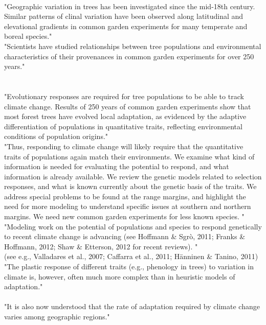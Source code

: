 \documentclass{article}
\begin{document}
\citep{AitkenBemmels16}\\
"Geographic variation in trees has been investigated since the mid-18th century. Similar patterns of clinal variation have been observed along latitudinal and elevational gradients in common garden experiments for many temperate and boreal species."\\
"Scientists have studied relationships between tree populations and environmental characteristics of their provenances in common garden experiments for over 250 years."\\
\\
\citep{Alberto13}\\
"Evolutionary responses are required for tree populations to be able to track climate change. Results of 250 years of common garden experiments show that most forest trees have evolved local adaptation, as evidenced by the adaptive differentiation of populations in quantitative traits, reflecting environmental conditions of population origins."\\
"Thus, responding to climate change will likely require that the quantitative traits of populations again match their environments. We examine what kind of information is needed for evaluating the potential to respond, and what information is already available. We review the genetic models related to selection responses, and what is known currently about the genetic basis of the traits. We address special problems to be found at the range margins, and highlight the need for more modeling to understand specific issues at southern and northern margins. We need new common garden experiments for less known species. "\\
"Modeling work on the potential of populations and species to respond genetically to recent climate change is advancing (see Hoffmann \& Sgrò, 2011; Franks \& Hoffmann, 2012; Shaw \& Etterson, 2012 for recent reviews). "\\

(see e.g., Valladares et al., 2007; Caffarra et al., 2011; Hänninen \& Tanino, 2011)
"The plastic response of different traits (e.g., phenology in trees) to variation in climate is, however, often much more complex than in heuristic models of adaptation."\\


\citep{Loarie09}\\ 
"It is also now understood that the rate of adaptation required by climate change varies among geographic regions." \\
\end{document}
